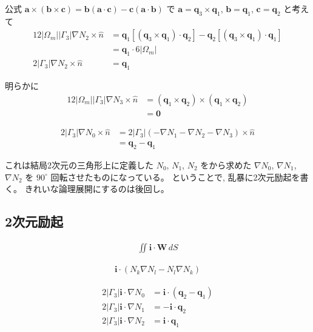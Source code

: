 公式
$\bm{a}\times\left(\bm{b}\times\bm{c}\right)
=\bm{b}\left(\bm{a}\cdot\bm{c}\right)
-\bm{c}\left(\bm{a}\cdot\bm{b}\right)$
で
$\bm{a}=\bm{q}_3\times\bm{q}_1$, $\bm{b}=\bm{q}_1$, $\bm{c}=\bm{q}_2$
と考えて
\begin{align}
12\left|\Omega_m\right|\left|\Gamma_3\right|\nabla N_2\times\hat{n}
&=\bm{q}_1\left[\left(\bm{q}_3\times\bm{q}_1\right)\cdot\bm{q}_2\right]
 -\bm{q}_2\left[\left(\bm{q}_3\times\bm{q}_1\right)\cdot\bm{q}_1\right]\\
&=\bm{q}_1\cdot6\left|\Omega_m\right|\\
2\left|\Gamma_3\right|\nabla N_2\times\hat{n}
&=\bm{q}_1
\end{align}

明らかに
\begin{align}
12\left|\Omega_m\right|\left|\Gamma_3\right|\nabla N_3\times\hat{n}
&=\left(\bm{q}_1\times\bm{q}_2\right)\times\left(\bm{q}_1\times\bm{q}_2\right)\\
&=\bm{0}
\end{align}

\begin{align}
2\left|\Gamma_3\right|\nabla N_0\times\hat{n}
&=2\left|\Gamma_3\right|
 \left(-\nabla N_1-\nabla N_2-\nabla N_3\right)\times\hat{n}\\
&=\bm{q}_2-\bm{q}_1
\end{align}

これは結局2次元の三角形上に定義した $N_0$, $N_1$, $N_2$
をから求めた $\nabla N_0$, $\nabla N_1$, $\nabla N_2$
を $90^\circ$ 回転させたものになっている。
ということで, 乱暴に2次元励起を書く。
きれいな論理展開にするのは後回し。

\subsection{2次元励起}

\begin{align}
\iint\bm{i}\cdot\bm{W}\,dS
\end{align}

\begin{align}
\bm{i}\cdot\left(N_k\nabla N_l-N_l\nabla N_k\right)
\end{align}

\begin{align}
2\left|\Gamma_3\right|\bm{i}\cdot\nabla N_0
&=\bm{i}\cdot\left(\bm{q}_2-\bm{q}_1\right)\\
2\left|\Gamma_3\right|\bm{i}\cdot\nabla N_1
&=-\bm{i}\cdot\bm{q}_2\\
2\left|\Gamma_3\right|\bm{i}\cdot\nabla N_2
&=\bm{i}\cdot\bm{q}_1
\end{align}

